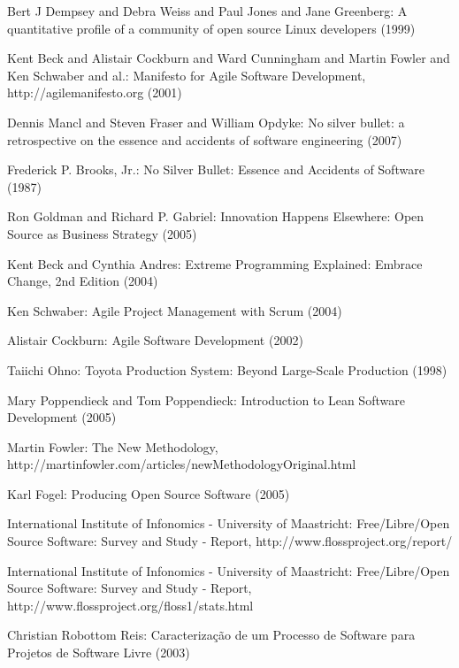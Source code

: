 \documentclass[lnbip]{svmultln}
\begin{document}
\begin{thebibliography}{5}

 Bert J Dempsey and Debra Weiss and Paul
  Jones and Jane Greenberg: A quantitative profile of a community of
  open source Linux developers (1999)

 Kent Beck and Alistair Cockburn and Ward
  Cunningham and Martin Fowler and Ken Schwaber and al.: Manifesto for
  Agile Software Development, http://agilemanifesto.org (2001)

 Dennis Mancl and Steven Fraser and
  William Opdyke: No silver bullet: a retrospective on the essence and
  accidents of software engineering (2007)

 Frederick P. Brooks, Jr.: No Silver Bullet:
  Essence and Accidents of Software (1987)

 Ron Goldman and Richard P. Gabriel: Innovation
  Happens Elsewhere: Open Source as Business Strategy (2005)

 Kent Beck and Cynthia Andres: Extreme Programming
  Explained: Embrace Change, 2nd Edition (2004)

 Ken Schwaber: Agile Project Management with
  Scrum (2004)

 Alistair Cockburn: Agile Software Development
  (2002)

 Taiichi Ohno: Toyota Production System: Beyond
  Large-Scale Production (1998)

 Mary Poppendieck and Tom Poppendieck:
  Introduction to Lean Software Development (2005)

 Martin Fowler: The New Methodology,
  http://martinfowler.com/articles/newMethodologyOriginal.html

 Karl Fogel: Producing Open Source Software (2005)

 International Institute of Infonomics -
  University of Maastricht: Free/Libre/Open Source Software: Survey
  and Study - Report, http://www.flossproject.org/report/

 International Institute of Infonomics -
  University of Maastricht: Free/Libre/Open Source Software: Survey
  and Study - Report, http://www.flossproject.org/floss1/stats.html

 Christian Robottom Reis: Caracteriza\c{c}\~{a}o de
  um Processo de Software para Projetos de Software Livre (2003)


\end{thebibliography}
\end{document}
